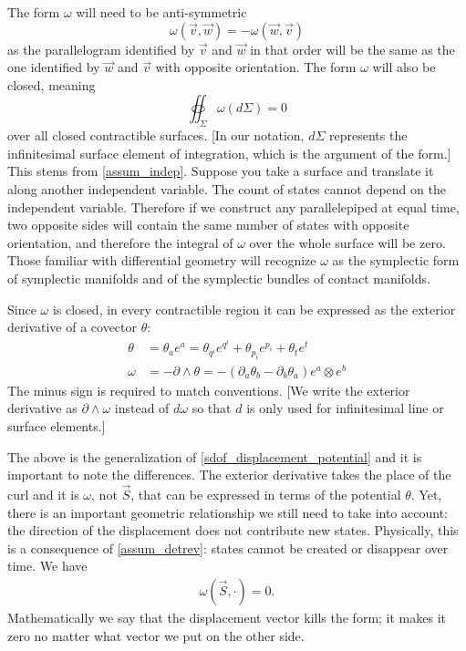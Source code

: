\documentclass[fleqn,10pt]{wlscirep}
\begin{document}
The form $\omega$ will need to be anti-symmetric
\begin{equation}\label{mdof_form_antisymm}
	\omega(\vec{v}, \vec{w}) = - \omega(\vec{w}, \vec{v})
\end{equation}
as the parallelogram identified by $\vec{v}$ and $\vec{w}$ in that order will be the same as the one identified by $\vec{w}$ and $\vec{v}$ with opposite orientation. The form $\omega$ will also be closed, meaning 
\begin{equation}\label{mdof_closed_form}
	\oiint_\Sigma \omega(d\Sigma) = 0
\end{equation}
over all closed contractible surfaces. [In our notation, $d\Sigma$ represents the infinitesimal surface element of integration, which is the argument of the form.] This stems from \ref{assum_indep}. Suppose you take a surface and translate it along another independent variable. The count of states cannot depend on the independent variable. Therefore if we construct any parallelepiped at equal time, two opposite sides will contain the same number of states with opposite orientation, and therefore the integral of $\omega$ over the whole surface will be zero. Those familiar with differential geometry will recognize $\omega$ as the symplectic form of symplectic manifolds and of the symplectic bundles of contact manifolds.

Since $\omega$ is closed, in every contractible region it can be expressed as the exterior derivative of a covector $\theta$:
\begin{equation}\label{mdof_form_potential}
	\begin{aligned}
		\theta &= \theta_a e^a = \theta_{q^i} e^{q^i} + \theta_{p_i} e^{p_i} + \theta_t e^t \\
		\omega &= - \partial \wedge \theta = - \left( \partial_a \theta_b - \partial_b \theta_a \right) e^a \otimes e^b
	\end{aligned}
\end{equation}
The minus sign is required to match conventions. [We write the exterior derivative as $\partial \wedge \omega$ instead of $d \omega$ so that $d$ is only used for infinitesimal line or surface elements.] 

The above is the generalization of \ref{sdof_displacement_potential} and it is important to note the differences. The exterior derivative takes the place of the curl and it is $\omega$, not $\vec{S}$, that can be expressed in terms of the potential $\theta$. Yet, there is an important geometric relationship we still need to take into account: the direction of the displacement does not contribute new states. Physically, this is a consequence of \ref{assum_detrev}: states cannot be created or disappear over time. We have
\begin{align}\label{mdof_displacement_kills}
	\omega(\vec{S}, \cdot) = 0.
\end{align}
Mathematically we say that the displacement vector kills the form; it makes it zero no matter what vector we put on the other side.
\end{document}
